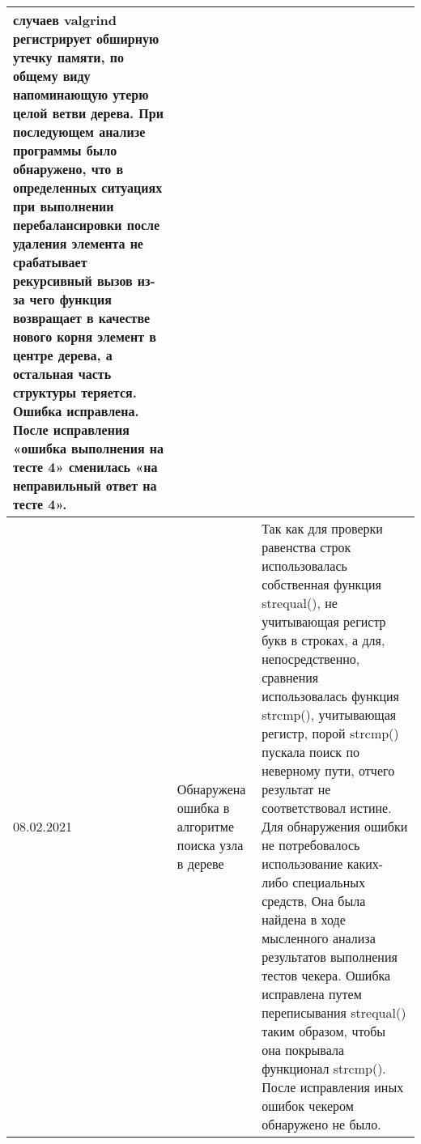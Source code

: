\begin{longtable}{|p{5cm}|p{5cm}|p{5cm}|}
	случаев valgrind регистрирует обширную утечку памяти, по общему виду напоминающую утерю целой ветви дерева. При последующем анализе программы было обнаружено, что
	в определенных ситуациях при выполнении перебалансировки после удаления элемента не срабатывает рекурсивный вызов из-за чего функция возвращает в качестве нового корня элемент в центре дерева, а остальная
	часть структуры теряется. Ошибка исправлена. После исправления «ошибка выполнения на тесте 4» сменилась «на неправильный ответ на тесте 4».\\\hline
	08.02.2021&Обнаружена ошибка в алгоритме поиска узла в дереве&Так как для проверки равенства строк использовалась собственная функция strequal(), не учитывающая регистр букв в строках, а для,
	непосредственно, сравнения использовалась функция strcmp(), учитывающая регистр, порой strcmp() пускала поиск по неверному пути, отчего результат не соответствовал истине. Для обнаружения ошибки
	не потребовалось использование каких-либо специальных средств, Она была найдена в ходе мысленного анализа результатов выполнения тестов чекера. Ошибка исправлена путем переписывания strequal()
	таким образом, чтобы она покрывала функционал strcmp(). После исправления иных ошибок чекером обнаружено не было.\\\hline
\end{longtable}

\pagebreak
